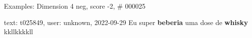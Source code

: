 \begin{frame}{Examples: Dimension 4 neg, score -2, \# 000025}
\footnotesize
\begin{alertblock}{text: t025849, user: unknown, 2022-09-29}
Eu super \textbf{beberia} uma dose de \textbf{whisky} kkllkkkkll 
\end{alertblock}
\end{frame}
